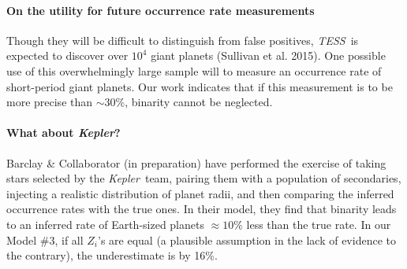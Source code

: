 \paragraph{On the utility for future occurrence rate measurements}
Though they will be difficult to distinguish from false positives, {\it TESS}\ 
is expected to discover over $10^4$ giant planets (Sullivan et al. 2015).
One possible use of this overwhelmingly large sample will to measure an
occurrence rate of short-period giant planets.
Our work indicates that if this measurement is to be more precise than $\sim 
30\%$, binarity cannot be neglected.


\paragraph{What about {\it Kepler}?}
Barclay \& Collaborator (in preparation) have performed the exercise 
of taking stars selected by the {\it Kepler}\ team, pairing them with a 
population of secondaries, injecting a realistic distribution of planet radii, 
and then comparing the inferred occurrence rates with the true ones.
In their model, they find that binarity leads to an inferred rate of 
Earth-sized planets $\approx 10\%$ less than the true rate.
In our Model \#3, if all $Z_i$'s are equal (a plausible assumption in 
the lack of evidence to the contrary), the underestimate is by 16\%.

